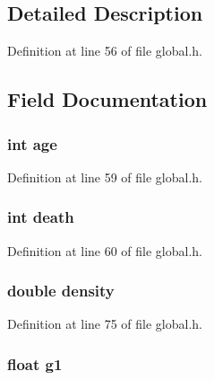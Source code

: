 \subsection{Detailed Description}


Definition at line 56 of file global.\-h.



\subsection{Field Documentation}
\hypertarget{structcellData_a91d98a856bbd96810b40af3ca5cc901a}{
\subsubsection[{age}]{\setlength{\rightskip}{0pt plus 5cm}int age}}\label{structcellData_a91d98a856bbd96810b40af3ca5cc901a}


Definition at line 59 of file global.\-h.

\hypertarget{structcellData_add1e1533be6e693ffedcdbafdf8b855c}{
\subsubsection[{death}]{\setlength{\rightskip}{0pt plus 5cm}int death}}\label{structcellData_add1e1533be6e693ffedcdbafdf8b855c}


Definition at line 60 of file global.\-h.

\hypertarget{structcellData_a6f8c052f8417728038991f7f2826d38d}{
\subsubsection[{density}]{\setlength{\rightskip}{0pt plus 5cm}double density}}\label{structcellData_a6f8c052f8417728038991f7f2826d38d}


Definition at line 75 of file global.\-h.

\hypertarget{structcellData_a581debe7d16bce9d187b97855f4e99d4}{
\subsubsection[{g1}]{\setlength{\rightskip}{0pt plus 5cm}float g1}}\label{structcellData_a581debe7d16bce9d187b97855f4e99d4}


